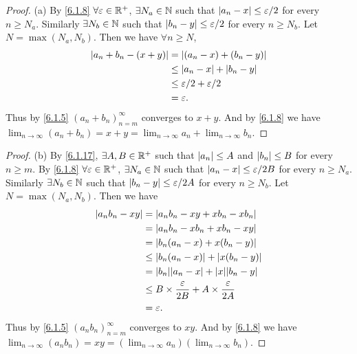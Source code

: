 \begin{proof}{(a)}
  By \cref{6.1.8} \(\forall \varepsilon \in \mathbb{R}^+\), \(\exists N_a \in \mathbb{N}\) such that \(\left\lvert a_n - x\right\rvert \leq \varepsilon / 2\) for every \(n \geq N_a\).
  Similarly \(\exists N_b \in \mathbb{N}\) such that \(\left\lvert b_n - y\right\rvert \leq \varepsilon / 2\) for every \(n \geq N_b\).
  Let \(N = \max(N_a, N_b)\).
  Then we have \(\forall n \geq N\),
  \begin{align*}
    \left\lvert a_n + b_n - (x + y)\right\rvert & = \left\lvert(a_n - x) + (b_n - y)\right\rvert          \\
                              & \leq \left\lvert a_n - x\right\rvert + \left\lvert b_n - y\right\rvert     \\
                              & \leq \varepsilon / 2 + \varepsilon / 2 \\
                              & = \varepsilon.
  \end{align*}
  Thus by \cref{6.1.5} \((a_n + b_n)_{n = m}^\infty\) converges to \(x + y\).
  And by \cref{6.1.8} we have \(\lim_{n \to \infty} (a_n + b_n) = x + y = \lim_{n \to \infty} a_n + \lim_{n \to \infty} b_n\).
\end{proof}

\begin{proof}{(b)}
  By \cref{6.1.17}, \(\exists A, B \in \mathbb{R}^+\) such that \(\left\lvert a_n\right\rvert \leq A\) and \(\left\lvert b_n\right\rvert \leq B\) for every \(n \geq m\).
  By \cref{6.1.8} \(\forall \varepsilon \in \mathbb{R}^+\), \(\exists N_a \in \mathbb{N}\) such that \(\left\lvert a_n - x\right\rvert \leq \varepsilon / 2B\) for every \(n \geq N_a\).
  Similarly \(\exists N_b \in \mathbb{N}\) such that \(\left\lvert b_n - y\right\rvert \leq \varepsilon / 2A\) for every \(n \geq N_b\).
  Let \(N = \max(N_a, N_b)\).
  Then we have
  \begin{align*}
    \abs{a_n b_n - x y} & = \abs{a_n b_n - x y + x b_n - x b_n}                                    \\
                        & = \abs{a_n b_n - x b_n + x b_n - x y}                                    \\
                        & = \abs{b_n(a_n - x) + x(b_n - y)}                                        \\
                        & \leq \abs{b_n(a_n - x)} + \abs{x(b_n - y)}                               \\
                        & = \abs{b_n}\abs{a_n - x} + \abs{x}\abs{b_n - y}                          \\
                        & \leq B \times \dfrac{\varepsilon}{2B} + A \times \dfrac{\varepsilon}{2A} \\
                        & = \varepsilon.
  \end{align*}
  Thus by \cref{6.1.5} \((a_n b_n)_{n = m}^\infty\) converges to \(x y\).
  And by \cref{6.1.8} we have \(\lim_{n \to \infty} (a_n b_n) = x y = (\lim_{n \to \infty} a_n)(\lim_{n \to \infty} b_n)\).
\end{proof}

